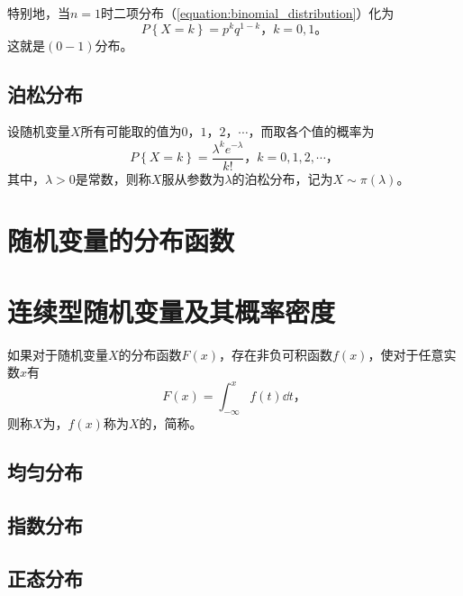 特别地，当$ n=1 $时二项分布（\ref{equation:binomial_distribution}）化为
\begin{equation}
	P\left\lbrace X = k \right\rbrace = p^{k}q^{1-k} \text{，} k = 0, 1 \text{。}
\end{equation}
这就是$ (0-1) $分布。

\subsection{泊松分布}

\begin{definition}
	设随机变量$ X $所有可能取的值为$ 0 $，$ 1 $，$ 2 $，$ \cdots $，而取各个值的概率为
	\begin{equation}
		P\left\lbrace X = k \right\rbrace = \frac{\lambda^{k}e^{-\lambda}}{k!}\text{，} k = 0, 1, 2, \cdots \text{，}
	\end{equation}
	其中，$ \lambda > 0 $是常数，则称$ X $服从参数为$ \lambda $的泊松分布，记为$ X \sim \pi(\lambda) $。
\end{definition}

\section{随机变量的分布函数}

\section{连续型随机变量及其概率密度}

如果对于随机变量$ X $的分布函数$ F(x) $，存在非负可积函数$ f(x) $，使对于任意实数$ x $有
\begin{equation}
	F(x) = \int_{-\infty}^{x}f(t)\dd{t}\text{，}
\end{equation}
则称$ X $为，$ f(x) $称为$ X $的，简称。

\subsection{均匀分布}

\subsection{指数分布}

\subsection{正态分布}

